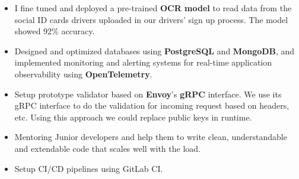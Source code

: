 \begin{itemize}
      \item I fine tuned and deployed a pre-trained \textbf{OCR model} to read data from the social ID cards drivers uploaded in our drivers' sign up process. The model showed 92\% accuracy.
      \item Designed and optimized databases using \textbf{PostgreSQL} and \textbf{MongoDB},
            and implemented monitoring and alerting systems for real-time application observability using \textbf{OpenTelemetry}.
      \item Setup prototype validator based on \textbf{Envoy}'s \textbf{gRPC} interface. We use its gRPC interface to do the validation for incoming request
            based on headers, etc. Using this approach we could replace public keys in runtime.
      \item Mentoring Junior developers and help them to write clean, understandable and extendable code that scales well with the load.
      \item Setup CI/CD pipelines using GitLab CI.
\end{itemize}

\vspace{0.5cm}

